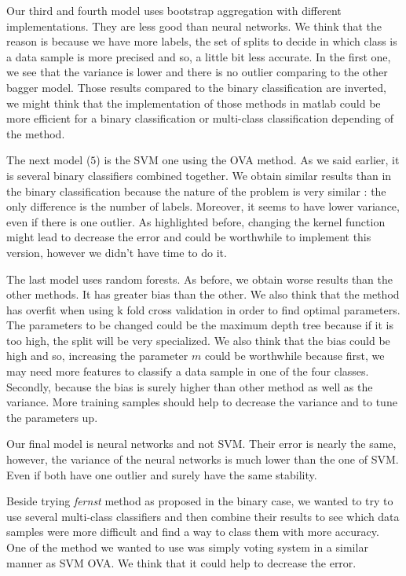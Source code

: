 \documentclass{article} %
\begin{document}
Our third and fourth model uses bootstrap aggregation with different implementations. They are less good than neural networks. We think that the reason is because we have more labels, the set of splits to decide in which class is a data sample is more precised and so, a little bit less accurate. In the first one, we see that the variance is lower and there is no outlier comparing to the other bagger model. Those results compared to the binary classification are inverted, we might think that the implementation of those methods in matlab could be more efficient for a binary classification or multi-class classification depending of the method.

The next model ($5$) is the SVM one using the OVA method. As we said earlier, it is several binary classifiers combined together. We obtain similar results than in the binary classification because the nature of the problem is very similar : the only difference is the number of labels. Moreover, it seems to have lower variance, even if there is one outlier. As highlighted before, changing the kernel function might lead to decrease the error and could be worthwhile to implement this version, however we didn't have time to do it.

The last model uses random forests. As before, we obtain worse results than the other methods. It has greater bias than the other.
We also think that the method has overfit when using k fold cross validation in order to find optimal parameters. The parameters to be changed could be the maximum depth tree because if it is too high, the split will be very specialized. We also think that the bias could be high and so, increasing the parameter $m$ could be worthwhile because first, we may need more features to classify a data sample in one of the four classes. Secondly, because the bias is surely higher than other method as well as the variance. More training samples should help to decrease the variance and to tune the parameters up.

Our final model is neural networks and not SVM. Their error is nearly the same, however, the variance of the neural networks is much lower than the one of SVM. Even if both have one outlier and surely have the same stability. 

Beside trying \textit{fernst} method as proposed in the binary case, we wanted to try to use several multi-class classifiers and then combine their results to see which data samples were more difficult and find a way to class them with more accuracy. One of the method we wanted to use was simply voting system in a similar manner as SVM OVA. We think that it could help to decrease the error.
\end{document}
